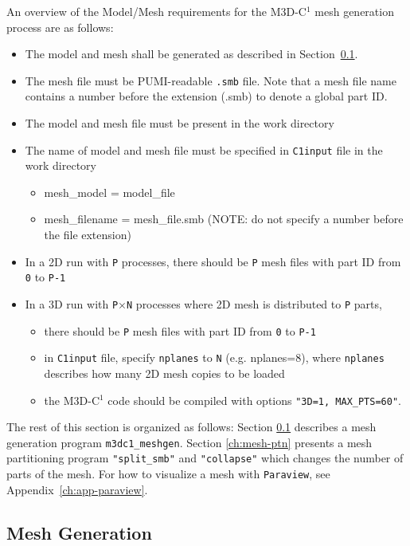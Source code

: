 An overview of the Model/Mesh requirements for the M3D-C$^{1}$ mesh generation process are as follows:
\begin{itemize}
\item	The model and mesh shall be generated as described in Section~\ref{ch:mesh-gen}.
\item	The mesh file must be PUMI-readable \texttt{.smb} file. Note that a mesh file name contains a number before the extension (.smb) to denote a global part ID.
\item	The model and mesh file must be present in the work directory
\item	The name of model and mesh file must be specified in \texttt{C1input} file in the work directory
\begin{itemize}
\item	mesh\_model = model\_file
\item	mesh\_filename = mesh\_file.smb (NOTE: do not specify a number before the file extension)
\end{itemize}
\item In a 2D run with \texttt{P} processes, there should be \texttt{P} mesh files with part ID from \texttt{0} to \texttt{P-1}
\item	In a 3D run with \texttt{P$\times$N} processes where 2D mesh is distributed to \texttt{P} parts, 
\begin{itemize}
\item	there should be \texttt{P} mesh files with part ID from \texttt{0} to \texttt{P-1}
\item	in \texttt{C1input} file, specify \texttt{nplanes} to \texttt{N} (e.g. nplanes=8), where \texttt{nplanes} describes how many 2D mesh copies to be loaded
\item	the M3D-C$^{1}$ code should be compiled with options \texttt{"3D=1, MAX\_PTS=60"}.
\end{itemize}
\end{itemize}

The rest of this section is organized as follows: Section \ref{ch:mesh-gen} describes a mesh generation program \texttt{m3dc1\_meshgen}. Section \ref{ch:mesh-ptn} presents a mesh partitioning program \texttt{"split\_smb"} and \texttt{"collapse"} which changes the number of parts of the mesh. For how to visualize a mesh with \texttt{Paraview}, see Appendix~\ref{ch:app-paraview}.

\subsection{Mesh Generation}
\label{ch:mesh-gen}

